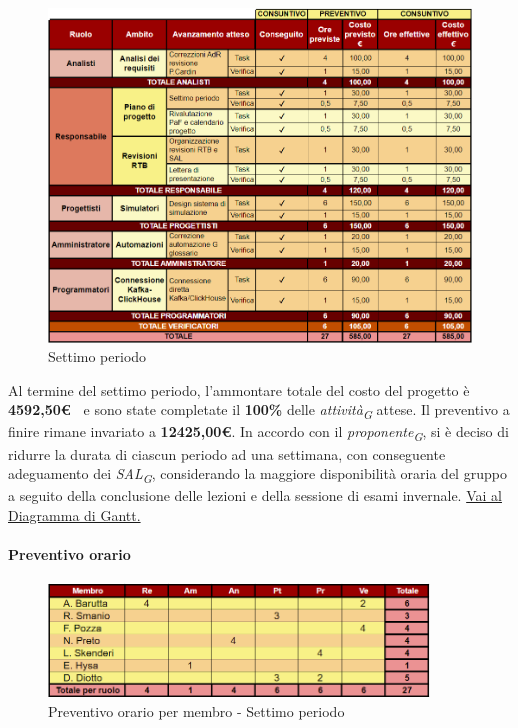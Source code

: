 \begin{figure}[H]
    \centering
    \includegraphics[height=0.9\textwidth]{../Images/periodo7.PNG}
    \caption{Settimo periodo}
    \label{fig:Settimo_periodo}
\end{figure}


Al termine del settimo periodo, l'ammontare totale del costo del progetto è \textbf{ 4592,50\euro\ } e sono state completate il \textbf{100\%} delle \textit{attività}\textsubscript{\textit{G}} attese.
Il preventivo a finire rimane invariato a \textbf{12425,00€}.
In accordo con il \textit{proponente}\textsubscript{\textit{G}}, si è deciso di ridurre la durata di ciascun periodo ad una settimana, con conseguente adeguamento dei \textit{SAL}\textsubscript{\textit{G}}, considerando la maggiore disponibilità oraria del gruppo a seguito della conclusione delle lezioni e della sessione di esami invernale.
\href{https://github.com/orgs/ByteOps-swe/projects/3/views/1?sortedBy%5Bdirection%5D=asc&sortedBy%5BcolumnId%5D=64182560}{Vai al Diagramma di Gantt.}

\pagebreak

\paragraph{Preventivo orario}

\begin{figure}[H] 
    \centering
    \includegraphics[width=0.9\textwidth]{../Images/preventivoOrario7Periodo.png}
    \caption{Preventivo orario per membro - Settimo periodo}
    \label{fig:Preventivo_orario_7}
\end{figure}

